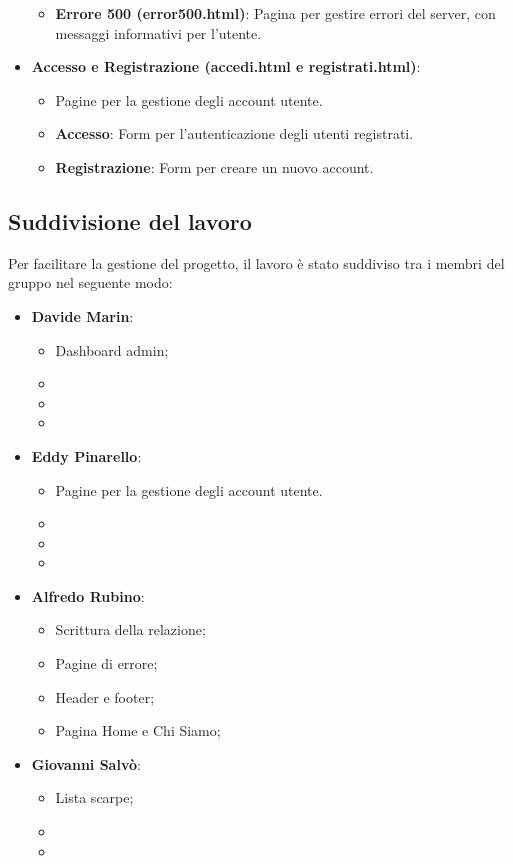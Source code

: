 \documentclass[a4paper, 12pt]{article}
\begin{document}
\begin{justify}
\begin{itemize}
\begin{itemize}
            \item \textbf{Errore 500 (error500.html)}: Pagina per gestire errori del server, con messaggi informativi per l'utente.
        \end{itemize}
    \item \textbf{Accesso e Registrazione (accedi.html e registrati.html)}:
        \begin{itemize}
            \item Pagine per la gestione degli account utente.
            \item \textbf{Accesso}: Form per l'autenticazione degli utenti registrati.
            \item \textbf{Registrazione}: Form per creare un nuovo account.
        \end{itemize}
\end{itemize}

\subsection{Suddivisione del lavoro}

Per facilitare la gestione del progetto, il lavoro è stato suddiviso tra i membri del gruppo nel seguente modo:
\begin{itemize}
    \item \textbf{Davide Marin}: 
        \begin{itemize}
            \item Dashboard admin;
            \item
            \item
            \item 
        \end{itemize}
    \item \textbf{Eddy Pinarello}:
        \begin{itemize}
            \item Pagine per la gestione degli account utente.
            \item
            \item
            \item
        \end{itemize}
    \item \textbf{Alfredo Rubino}:
        \begin{itemize}
            \item Scrittura della relazione;
            \item Pagine di errore;
            \item Header e footer;
            \item Pagina Home e Chi Siamo;
        \end{itemize}
    \item \textbf{Giovanni Salvò}:
        \begin{itemize}
            \item Lista scarpe;
            \item
            \item
        \end{itemize}
\end{itemize}



\end{justify}
\end{document}
